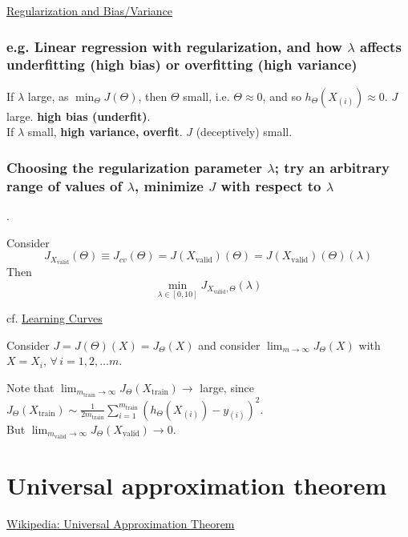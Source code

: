 \documentclass[10pt]{amsart}
\begin{document}
\begin{multicols*}{2}
\href{https://www.coursera.org/learn/machine-learning/lecture/4VDlf/regularization-and-bias-variance}{Regularization and Bias/Variance}  

\subsubsection{e.g. Linear regression with regularization, and how $\lambda$ affects underfitting (high bias) or overfitting (high variance)}

If $\lambda$ large, as $\min_{\Theta} J(\Theta)$, then $\Theta$ small, i.e. $\Theta \approx 0$, and so $h_{\Theta}(X_{(i)}) \approx 0$.  $J$ large.  \textbf{high bias (underfit)}.  \\
If $\lambda$ small, \textbf{high variance, overfit}.  $J$ (deceptively) small.  

\subsubsection{Choosing the regularization parameter $\lambda$; try an arbitrary range of values of $\lambda$, minimize $J$ with respect to $\lambda$}.  

Consider
\[
J_{X_{\text{valid}}}(\Theta) \equiv J_{cv}(\Theta) = J(X_{\text{valid}})(\Theta) = J(X_{\text{valid}})(\Theta)(\lambda)
\]
Then 
\[
\min_{\lambda \in [0,10] }J_{X_{\text{valid}},\Theta}(\lambda)
\]

cf. \href{https://www.coursera.org/learn/machine-learning/lecture/Kont7/learning-curves}{Learning Curves}

Consider $J=J(\Theta)(X) = J_{\Theta}(X)$ and consider $\lim_{m\to \infty} J_{\Theta}(X)$ with $X= X_i$, $\forall \, i =1,2,\dots m$.  

Note that $\lim_{m_{\text{train}}\to \infty} J_{\Theta}(X_{\text{train}}) \to $ large, since $J_{\Theta}(X_{\text{train}}) \sim \frac{1}{2m_{\text{train}}} \sum_{i=1}^{m_{\text{train}}} (h_{\Theta}(X_{(i)}) -y_{(i)})^2$.  \\
But $\lim_{m_{\text{valid}} \to \infty} J_{\Theta}(X_{\text{valid}}) \to 0$.  




\section{Universal approximation theorem}

\href{https://en.wikipedia.org/wiki/Universal_approximation_theorem}{Wikipedia: Universal Approximation Theorem}


\end{multicols*}
\end{document}
